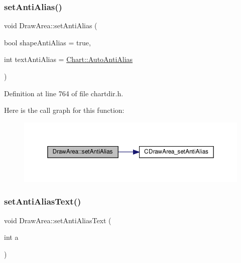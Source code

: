 \subsubsection{\texorpdfstring{set\+Anti\+Alias()}{setAntiAlias()}}
{\footnotesize\ttfamily void Draw\+Area\+::set\+Anti\+Alias (\begin{DoxyParamCaption}\item[{bool}]{shape\+Anti\+Alias = {\ttfamily true},  }\item[{int}]{text\+Anti\+Alias = {\ttfamily \hyperlink{namespace_chart_a07883b6d552537a99c7dab3bdc641d2ba793ff02fc6d46a7d5ebcbac29e111a3f}{Chart\+::\+Auto\+Anti\+Alias}} }\end{DoxyParamCaption})\hspace{0.3cm}{\ttfamily [inline]}}



Definition at line 764 of file chartdir.\+h.

Here is the call graph for this function\+:
\nopagebreak
\begin{figure}[H]
\begin{center}
\leavevmode
\includegraphics[width=350pt]{class_draw_area_ae92db9b13c442678d5be8d16470c7bed_cgraph}
\end{center}
\end{figure}
\mbox{\label{class_draw_area_a3962cbcc8d0c5964766ea3322ae9b263}} 
\subsubsection{\texorpdfstring{set\+Anti\+Alias\+Text()}{setAntiAliasText()}}
{\footnotesize\ttfamily void Draw\+Area\+::set\+Anti\+Alias\+Text (\begin{DoxyParamCaption}\item[{int}]{a }\end{DoxyParamCaption})\hspace{0.3cm}{\ttfamily [inline]}}



